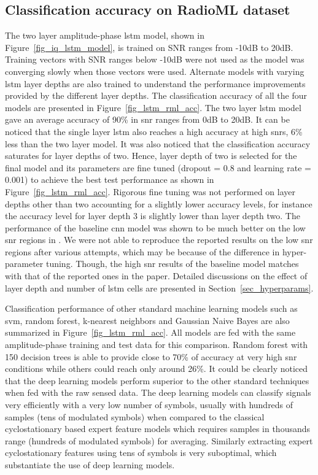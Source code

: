 \subsection{Classification accuracy on RadioML dataset}
The two layer amplitude-phase \ac{lstm} model, shown in Figure~\ref{fig_iq_lstm_model}, is trained on SNR ranges from -10dB to 20dB. Training vectors with SNR ranges below -10dB were not used as the model was converging slowly when those vectors were used. Alternate models with varying \ac{lstm} layer depths are also trained to understand the performance improvements provided by the different layer depths. The classification accuracy of all the four models are presented in Figure~\ref{fig_lstm_rml_acc}. The two layer \ac{lstm} model gave an average accuracy of 90\% in \ac{snr} ranges from 0dB to 20dB. It can be noticed that the single layer \ac{lstm} also reaches a high accuracy at high \ac{snr}s, 6\% less than the two layer model. It was also noticed that the classification accuracy saturates for layer depths of two. Hence, layer depth of two is selected for the final model and its parameters are fine tuned (dropout = 0.8 and learning rate = 0.001) to achieve the best test performance as shown in Figure~\ref{fig_lstm_rml_acc}. Rigorous fine tuning was not performed on layer depths other than two accounting for a slightly lower accuracy levels, for instance the accuracy level for layer depth 3 is slightly lower than layer depth two.  The performance of the baseline \ac{cnn} model was shown to be much better on the low \ac{snr} regions in \cite{baseline}. We were not able to reproduce the reported results on the low \ac{snr} regions after various attempts, which may be because of the difference in hyper-parameter tuning. Though, the high \ac{snr} results of the baseline model matches with that of the reported ones in the paper. Detailed discussions on the effect of layer depth and number of \ac{lstm} cells are presented in Section~\ref{sec_hyperparams}.

Classification performance of other standard machine learning models such as \ac{svm}, random forest, k-nearest neighbors and Gaussian Naive Bayes are also summarized in Figure~\ref{fig_lstm_rml_acc}. All models are fed with the same amplitude-phase training and test data for this comparison. Random forest with 150 decision trees is able to provide close to 70\% of accuracy at very high \ac{snr} conditions while others could reach only around 26\%. It could be clearly noticed that the deep learning models perform superior to the other standard techniques when fed with the raw sensed data. The deep learning models can classify signals very efficiently with a very low number of symbols, usually with hundreds of samples (tens of modulated symbols) when compared to the classical cyclostationary based expert feature models which requires samples in thousands range (hundreds of modulated symbols) for averaging. Similarly extracting expert cyclostationary features using tens of symbols is very suboptimal, which substantiate the use of deep learning models.

